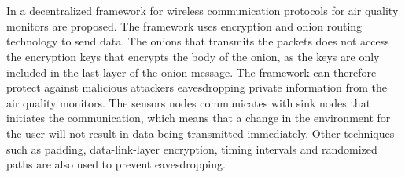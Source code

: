 \\\\
In \cite{PrivacyAndFrameworkDecentAQM} a decentralized framework for wireless communication protocols for air quality monitors are proposed. The framework uses encryption and onion routing technology to send data. The onions that transmits the packets does not access the encryption keys that encrypts the body of the onion, as the keys are only included in the last layer of the onion message. The framework can therefore protect against malicious attackers eavesdropping private information from the air quality monitors. The sensors nodes communicates with sink nodes that initiates the communication, which means that a change in the environment for the user will not result in data being transmitted immediately. Other techniques such as padding, data-link-layer encryption, timing intervals and randomized paths are also used to prevent eavesdropping. 

